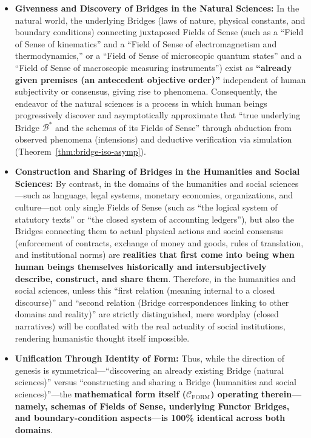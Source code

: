 \documentclass[11pt,a4paper]{article}
\theoremstyle{definition}
\theoremstyle{plain}
\theoremstyle{remark}
\newcommand{\CFORM}{\mathcal{C}_{\mathrm{FORM}}}
\begin{document}
\begin{itemize}
    \item \textbf{Givenness and Discovery of Bridges in the Natural Sciences:}
    In the natural world, the underlying Bridges (laws of nature, physical constants, and boundary conditions) connecting juxtaposed Fields of Sense (such as a ``Field of Sense of kinematics'' and a ``Field of Sense of electromagnetism and thermodynamics,'' or a ``Field of Sense of microscopic quantum states'' and a ``Field of Sense of macroscopic measuring instruments'') exist as \textbf{``already given premises (an antecedent objective order)''} independent of human subjectivity or consensus, giving rise to phenomena. Consequently, the endeavor of the natural sciences is a process in which human beings progressively discover and asymptotically approximate that ``true underlying Bridge $\mathcal{B}^*$ and the schemas of its Fields of Sense'' through abduction from observed phenomena (intensions) and deductive verification via simulation (Theorem~\ref{thm:bridge-iso-asymp}).
    \item \textbf{Construction and Sharing of Bridges in the Humanities and Social Sciences:}
    By contrast, in the domains of the humanities and social sciences---such as language, legal systems, monetary economies, organizations, and culture---not only single Fields of Sense (such as ``the logical system of statutory texts'' or ``the closed system of accounting ledgers''), but also the Bridges connecting them to actual physical actions and social consensus (enforcement of contracts, exchange of money and goods, rules of translation, and institutional norms) are \textbf{realities that first come into being when human beings themselves historically and intersubjectively describe, construct, and share them}. Therefore, in the humanities and social sciences, unless this ``first relation (meaning internal to a closed discourse)'' and ``second relation (Bridge correspondences linking to other domains and reality)'' are strictly distinguished, mere wordplay (closed narratives) will be conflated with the real actuality of social institutions, rendering humanistic thought itself impossible.
    \item \textbf{Unification Through Identity of Form:}
    Thus, while the direction of genesis is symmetrical---``discovering an already existing Bridge (natural sciences)'' versus ``constructing and sharing a Bridge (humanities and social sciences)''---the \textbf{mathematical form itself ($\CFORM$) operating therein---namely, schemas of Fields of Sense, underlying Functor Bridges, and boundary-condition aspects---is 100\% identical across both domains}.
\end{itemize}
\end{document}
